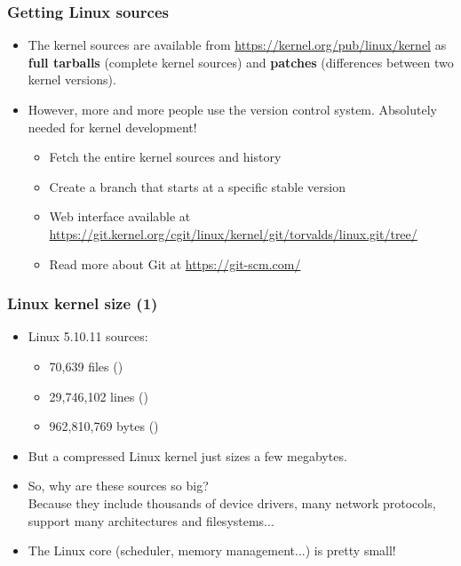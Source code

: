 \begin{frame}
  \frametitle{Getting Linux sources}
  \begin{itemize}
  \item The kernel sources are available from
    \url{https://kernel.org/pub/linux/kernel} as {\bf full tarballs}
    (complete kernel sources) and {\bf patches} (differences between
    two kernel versions).
  \item However, more and more people use the  version
    control system. Absolutely needed for kernel development!
    \begin{itemize}
    \item Fetch the entire kernel sources and history\\
      {\footnotesize
      }
    \item Create a branch that starts at a specific stable version\\
    \item Web interface available at
      \url{https://git.kernel.org/cgit/linux/kernel/git/torvalds/linux.git/tree/}
    \item Read more about Git at \url{https://git-scm.com/}
    \end{itemize}
  \end{itemize}
\end{frame}

\begin{frame}
  \frametitle{Linux kernel size (1)}
  \begin{itemize}
  \item Linux 5.10.11 sources:\\
    \begin{itemize}
	\item 70,639 files ()
	\item 29,746,102 lines ()
	\item 962,810,769 bytes ()
    \end{itemize}
  \item But a compressed Linux kernel just sizes a few megabytes.
  \item So, why are these sources so big?\\
    Because they include thousands of device drivers, many network
    protocols, support many architectures and filesystems...
  \item The Linux core (scheduler, memory management...) is pretty
    small!
  \end{itemize}
\end{frame}

